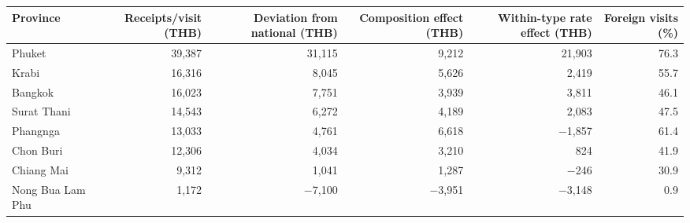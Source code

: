 \begin{tabular}{lrrrrr}
\toprule
Province & Receipts/visit (THB) & Deviation from national (THB) & Composition effect (THB) & Within-type rate effect (THB) & Foreign visits (\%) \\
\midrule
Phuket & 39,387 & 31,115 & 9,212 & 21,903 & 76.3 \\
Krabi & 16,316 & 8,045 & 5,626 & 2,419 & 55.7 \\
Bangkok & 16,023 & 7,751 & 3,939 & 3,811 & 46.1 \\
Surat Thani & 14,543 & 6,272 & 4,189 & 2,083 & 47.5 \\
Phangnga & 13,033 & 4,761 & 6,618 & $-$1,857 & 61.4 \\
Chon Buri & 12,306 & 4,034 & 3,210 & 824 & 41.9 \\
Chiang Mai & 9,312 & 1,041 & 1,287 & $-$246 & 30.9 \\
Nong Bua Lam Phu & 1,172 & $-$7,100 & $-$3,951 & $-$3,148 & 0.9 \\
\bottomrule
\end{tabular}
